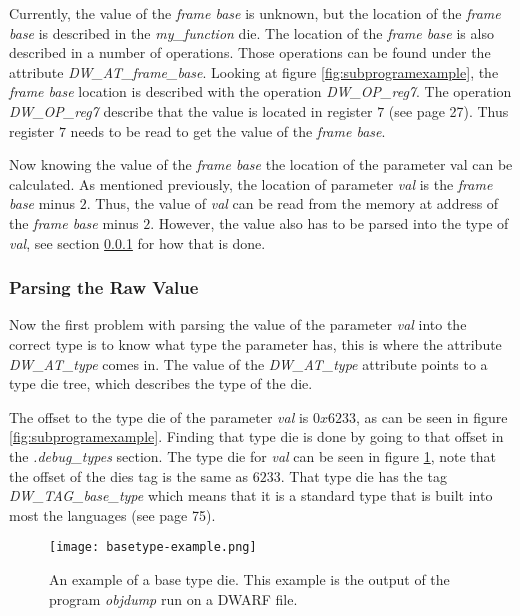 Currently, the value of the \emph{frame base} is unknown, but the location of the \emph{frame base}  is described in the \emph{my\_function} \gls{die}.
The location of the \emph{frame base} is also described in a number of operations.
Those operations can be found under the attribute \emph{DW\_AT\_frame\_base}.
Looking at figure \ref{fig:subprogramexample}, the \emph{frame base} location is described with the operation \emph{DW\_OP\_reg7}.
The operation \emph{DW\_OP\_reg7} describe that the value is located in register $7$ (see \cite{dwarf} page 27).
Thus register $7$ needs to be read to get the value of the \emph{frame base}.


Now knowing the value of the \emph{frame base} the location of the parameter val can be calculated.
As mentioned previously, the location of parameter \emph{val} is the \emph{frame base} minus $2$.
Thus, the value of \emph{val} can be read from the memory at address of the \emph{frame base} minus $2$.
However, the value also has to be parsed into the type of \emph{val}, see section \ref{sec:parsingvalue} for how that is done.


\subsubsection{Parsing the Raw Value} \label{sec:parsingvalue}
Now the first problem with parsing the value of the parameter \emph{val} into the correct type is to know what type the parameter has, this is where the attribute \emph{DW\_AT\_type} comes in.
The value of the \emph{DW\_AT\_type} attribute points to a type \gls{die} tree, which describes the type of the \gls{die}.


The offset to the type \gls{die} of the parameter \emph{val} is $0x6233$, as can be seen in figure \ref{fig:subprogramexample}.
Finding that type \gls{die} is done by going to that offset in the \emph{.debug\_types} section.
The type \gls{die} for \emph{val} can be seen in figure \ref{fig:basetypeexample}, note that the offset of the \glspl{die} tag is the same as $6233$.
That type \gls{die} has the tag \emph{DW\_TAG\_base\_type} which means that it is a standard type that is built into most the languages (see \cite{dwarf} page 75).


\begin{figure}[h]
	\centering
	\texttt{[image: basetype-example.png]}
	\caption{An example of a base type \gls{die}. This example is the output of the program \emph{objdump} run on a \gls{DWARF} file.}
	\label{fig:basetypeexample}
\end{figure}


